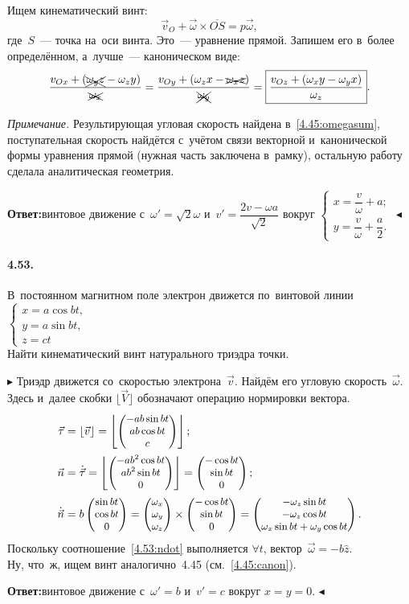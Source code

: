 \documentclass{weekly}
\begin{document}
Ищем кинематический винт:
\begin{equation}
    \vec v_O + \vec\omega \times \overline{OS} = p\vec\omega,
\end{equation}
где~$S$~--- точка на~оси винта. Это~--- уравнение прямой.
Запишем его в~более определённом, а~лучше~--- каноническом виде:
\begin{equation}
    \frac{v_{Ox} + \left(\xcancel{\omega_y z} - \omega_z y\right)}
        {\xcancel{\omega_x}} =
    \frac{v_{Oy} + \left(\omega_z x - \xcancel{\omega_x z}\right)}
        {\xcancel{\omega_y}} =
    \boxed{\frac{v_{Oz} + \left(\omega_x y - \omega_y x\right)}
        {\omega_z}}. \label{4.45:canon}
\end{equation}

\textsl{Примечание.} Результирующая угловая скорость найдена
в~\eqref{4.45:omegasum}, поступательная скорость найдётся
с~учётом связи векторной и~канонической формы уравнения прямой
(нужная часть заключена в~рамку), остальную работу сделала
аналитическая геометрия.

\textbf{Ответ:}\quad винтовое движение с~$\omega' = \sqrt{2}\omega$
и~$v' = \dfrac{2v - \omega a}{\sqrt{2}}$ вокруг
$
\begin{cases}
    x = \dfrac{v}{\omega} + a; \\[2ex]
    y = \dfrac{v}{\omega} + \dfrac{a}{2}.
\end{cases}
$
\hfill $\blacktriangleleft$


\paragraph{4.53.} В~постоянном магнитном поле электрон движется
по~винтовой линии {\footnotesize
$
\begin{cases}
    x = a \cos bt, \\
    y = a \sin bt, \\
    z = ct
\end{cases}
$}\\[-2.5ex]
Найти кинематический винт натурального триэдра точки.

$\blacktriangleright$ Триэдр движется со~скоростью электрона~$\vec v$.
Найдём его угловую скорость~$\vec\omega$.
Здесь и~далее скобки $\lfloor \vec V \rfloor$ обозначают
операцию нормировки вектора.
\begin{align}
    \vec\tau &= \lfloor\vec v\rfloor
        = \left\lfloor \small\begin{pmatrix}-ab \sin bt\\ab \cos bt\\c\end{pmatrix} \right\rfloor;\\
    \vec n &= \dot{\vec\tau}
        = \left\lfloor \small\begin{pmatrix}-ab^2 \cos bt\\ab^2 \sin bt\\0\end{pmatrix}\right\rfloor
        = \small\begin{pmatrix}-\cos bt\\\sin bt\\0\end{pmatrix}; \\
    \dot{\vec n} &= b \small\begin{pmatrix}\sin bt\\\cos bt\\0\end{pmatrix}
        = \small\begin{pmatrix}\omega_x\\\omega_y\\\omega_z\end{pmatrix} \times
            \small\begin{pmatrix}-\cos bt\\\sin bt\\0\end{pmatrix}
        = \small\begin{pmatrix}-\omega_z \sin bt\\-\omega_z \cos bt\\\omega_x \sin bt + \omega_y \cos bt\end{pmatrix}. \label{4.53:ndot}
\end{align}
Поскольку соотношение~\eqref{4.53:ndot} выполняется $\forall t$,
вектор~$\vec\omega = -b \hat z$.\\
Ну, что~ж, ищем винт аналогично~4.45 (см.~\eqref{4.45:canon}).

\textbf{Ответ:}\quad винтовое движение с~$\omega' = b$
и~$v' = c$ вокруг $x = y = 0$.
\hfill $\blacktriangleleft$
\end{document}
